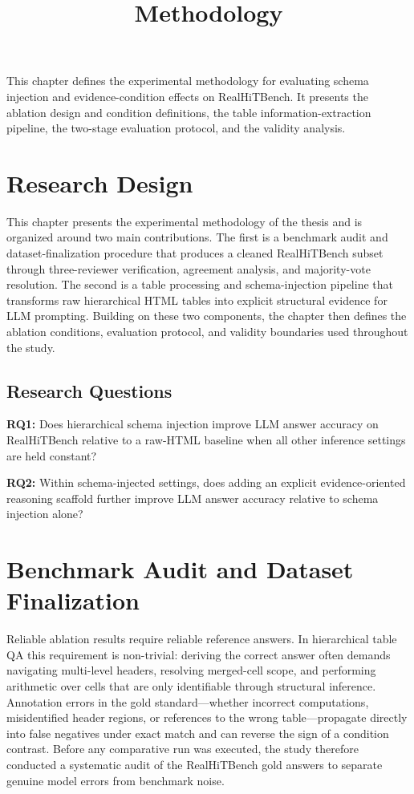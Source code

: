﻿\documentclass[a4paper]{article}
\title{Methodology}
\author{}
\date{}
\begin{document}
\maketitle

This chapter defines the experimental methodology for evaluating schema injection and evidence-condition effects on RealHiTBench. It presents the ablation design and condition definitions, the table information-extraction pipeline, the two-stage evaluation protocol, and the validity analysis.

\section{Research Design}

This chapter presents the experimental methodology of the thesis
and is organized around two main contributions. The first is a
benchmark audit and dataset-finalization procedure that produces a
cleaned RealHiTBench subset through three-reviewer verification,
agreement analysis, and majority-vote resolution. The second is a
table processing and schema-injection pipeline that transforms raw
hierarchical HTML tables into explicit structural evidence for LLM
prompting. Building on these two components, the chapter then
defines the ablation conditions, evaluation protocol, and validity
boundaries used throughout the study.

\subsection{Research Questions}

\textbf{RQ1:} Does hierarchical schema injection improve LLM answer accuracy on RealHiTBench relative to a raw-HTML baseline when all other inference settings are held constant?

\textbf{RQ2:} Within schema-injected settings, does adding an explicit evidence-oriented reasoning scaffold further improve LLM answer accuracy relative to schema injection alone?

\section{Benchmark Audit and Dataset Finalization}

Reliable ablation results require reliable reference answers. In hierarchical table QA this requirement is non-trivial: deriving the correct answer often demands navigating multi-level headers, resolving merged-cell scope, and performing arithmetic over cells that are only identifiable through structural inference. Annotation errors in the gold standard---whether incorrect computations, misidentified header regions, or references to the wrong table---propagate directly into false negatives under exact match and can reverse the sign of a condition contrast. Before any comparative run was executed, the study therefore conducted a systematic audit of the RealHiTBench gold answers to separate genuine model errors from benchmark noise.
\end{document}
